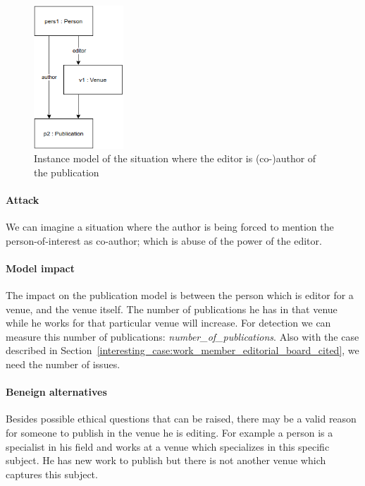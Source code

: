 \documentclass{ou-report}
\begin{document}
\begin{figure}
    \centering
    \includegraphics[width=0.3\textwidth]{images/editor_is_author.drawio.png}
    \caption{Instance model of the situation where the editor is \mbox{(co-)author} of the publication}
    \label{fig:eia}
\end{figure}



\paragraph{Attack}
We can imagine a situation where the author is being forced to mention the 
person-of-interest as co-author; which is abuse of the power of the editor.

\paragraph{Model impact}
The impact on the publication model is between the person which is 
\mbox{editor} for a 
venue, and the venue itself. 
The number of publications he has in that venue while he works for that 
particular venue 
will increase. For detection we can measure this number of publications:
\textit{number\_of\_publications}. Also with the 
case described in 
Section~\ref{interesting_case:work_member_editorial_board_cited}, we need the 
number of issues.

\paragraph{Beneign alternatives}
Besides possible ethical questions that can be raised, there may be a valid
reason for someone to publish in the venue he is editing. For example a person
is a 
specialist in his field and works at a venue which specializes in this 
specific subject. He has new work to publish but there is not another venue 
which captures this subject.
\end{document}
